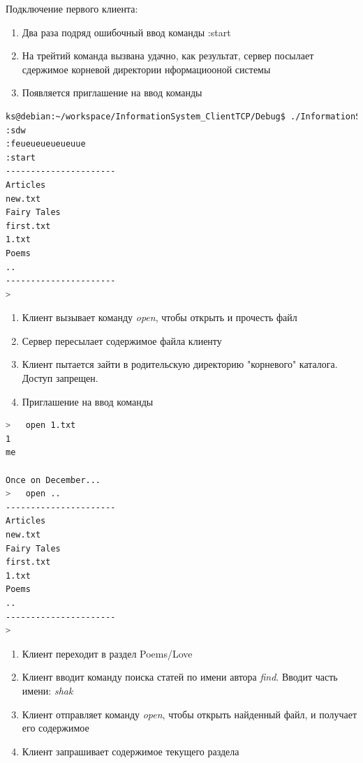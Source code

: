 \documentclass[12pt,a4paper]{report}
\begin{document}
Подключение первого клиента:\\
\begin{enumerate}
\item Два раза подряд ошибочный ввод команды :start
\item На трейтий команда вызвана удачно, как результат, сервер посылает сдержимое корневой директории нформациооной системы
\item Появляется приглашение на ввод команды
\end{enumerate}
\begin{lstlisting}[language=sh]
ks@debian:~/workspace/InformationSystem_ClientTCP/Debug$ ./InformationSystem_ClientTCP 
:sdw
:feueueueueueuue
:start
----------------------
Articles
new.txt
Fairy Tales
first.txt
1.txt
Poems
..
----------------------
>   
\end{lstlisting}
\begin{enumerate}
\item Клиент вызывает команду \textit{open}, чтобы открыть и прочесть файл
\item Сервер пересылает содержимое файла клиенту
\item Клиент пытается зайти в родительскую директорию "корневого" каталога. Доступ запрещен. 
\item Приглашение на ввод команды
\end{enumerate}
\begin{lstlisting}[language=sh]
>   open 1.txt
1
me

Once on December...
>   open ..
----------------------
Articles
new.txt
Fairy Tales
first.txt
1.txt
Poems
..
----------------------
>  
\end{lstlisting}

\begin{enumerate}
\item Клиент переходит в раздел Poems/Love
\item Клиент вводит команду поиска статей по имени автора \textit{find}. Вводит часть имени: \textit{shak}
\item Клиент отправляет команду \textit{open}, чтобы открыть найденный файл, и получает его содержимое
\item Клиент запрашивает содержимое текущего раздела
\end{enumerate}
\end{document}
